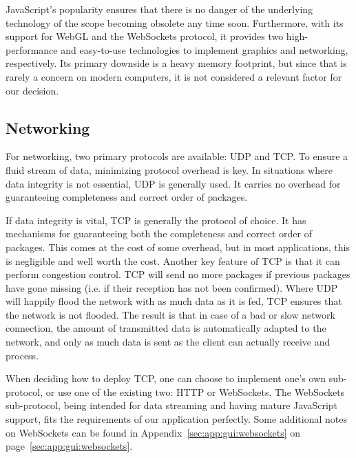 JavaScript's  popularity ensures  that there  is no  danger of  the underlying
technology  of  the  scope   becoming  obsolete  any  time  soon. Furthermore,
with  its support  for  WebGL and  the WebSockets  protocol,  it provides  two
high-performance  and  easy-to-use  technologies  to  implement  graphics  and
networking, respectively. Its  primary downside  is a heavy  memory footprint,
but since that is rarely a concern on modern computers, it is not considered a
relevant factor for our decision.

%
%
\subsection{Networking} %
\label{subsec:gui:networking}

For networking, two primary protocols are available: UDP and TCP.  To ensure a
fluid stream of data, minimizing protocol overhead is key. In situations where
data integrity is not essential, UDP is generally used. It carries no overhead
for guaranteeing completeness and correct order of packages.

If data  integrity is vital, TCP  is generally the protocol  of choice. It has
mechanisms  for  guaranteeing  both  the completeness  and  correct  order  of
packages.  This comes at the cost  of some overhead, but in most applications,
this is negligible and well worth the cost. Another key feature of TCP is that
it can perform congestion control. TCP will  send no more packages if previous
packages  have  gone missing  (i.e. if  their  reception has  not  been
confirmed).  Where UDP will happily flood the network with as much data as it
is fed,  TCP ensures that  the network is not  flooded. The result is  that in
case of a  bad or slow network  connection, the amount of  transmitted data is
automatically adapted  to the network,  and only as much  data is sent  as the
client can actually receive and process.

When  deciding how  to  deploy TCP,  one  can choose  to  implement one's  own
sub-protocol,  or  use  one  of   the  existing  two: HTTP  or  WebSockets. The
WebSockets  sub-protocol,   being  intended  for  data   streaming  and  having
mature  JavaScript   support,  fits   the  requirements  of   our  application
perfectly.    Some  additional   notes   on  WebSockets   can   be  found   in
Appendix~\ref{sec:app:gui:websockets} on page~\ref{sec:app:gui:websockets}.

